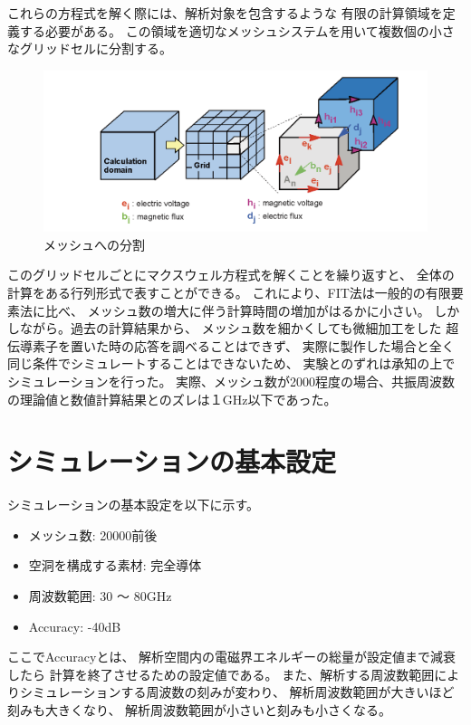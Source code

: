 これらの方程式を解く際には、解析対象を包含するような
有限の計算領域を定義する必要がある。
この領域を適切なメッシュシステムを用いて複数個の小さなグリッドセルに分割する。

\vspace{10 mm}

\begin{figure}[h]
  \begin{center}
    \includegraphics[width=12cm]{./image/mesh.png}
    \caption{メッシュへの分割\cite{MWS-2}}
    \label{fig:Mesh}
  \end{center}
\end{figure}

このグリッドセルごとにマクスウェル方程式を解くことを繰り返すと、
全体の計算をある行列形式で表すことができる。
これにより、FIT法は一般的の有限要素法に比べ、
メッシュ数の増大に伴う計算時間の増加がはるかに小さい。
しかしながら。過去の計算結果から、
メッシュ数を細かくしても微細加工をした
超伝導素子を置いた時の応答を調べることはできず、
実際に製作した場合と全く同じ条件でシミュレートすることはできないため、
実験とのずれは承知の上でシミュレーションを行った。
実際、メッシュ数が2000程度の場合、共振周波数の理論値と数値計算結果とのズレは１GHz以下であった。

\section{シミュレーションの基本設定}
シミュレーションの基本設定を以下に示す。

\begin{itemize}
  \item メッシュ数: 20000前後
  \item 空洞を構成する素材: 完全導体
  \item 周波数範囲: 30 〜 80GHz
  \item Accuracy: -40dB
\end{itemize}

ここでAccuracyとは、
解析空間内の電磁界エネルギーの総量が設定値まで減衰したら
計算を終了させるための設定値である。
また、解析する周波数範囲によりシミュレーションする周波数の刻みが変わり、
解析周波数範囲が大きいほど刻みも大きくなり、
解析周波数範囲が小さいと刻みも小さくなる。

